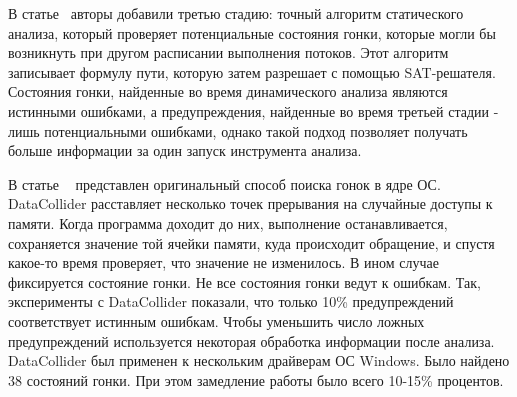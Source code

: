 В статье~\cite{Yoga:2016:PDR} авторы добавили третью стадию: точный алгоритм статического анализа, который проверяет потенциальные состояния гонки, которые могли бы возникнуть при другом расписании выполнения потоков.
Этот алгоритм записывает формулу пути, которую затем разрешает с помощью SAT-решателя.
Состояния гонки, найденные во время динамического анализа являются истинными ошибками, а предупреждения, найденные во время третьей стадии - лишь потенциальными ошибками, однако такой подход позволяет получать больше информации за один запуск инструмента анализа.

В статье ~\cite{DataCollider} представлен оригинальный способ поиска гонок в ядре ОС.
DataCollider расставляет несколько точек прерывания на случайные доступы к памяти.
Когда программа доходит до них, выполнение останавливается, сохраняется значение той ячейки памяти, куда происходит обращение, и спустя какое-то время проверяет, что значение не изменилось.
В ином случае фиксируется состояние гонки.
Не все состояния гонки ведут к ошибкам. Так, эксперименты с DataCollider показали, что только 10\% предупреждений соответствует истинным ошибкам. Чтобы уменьшить число ложных предупреждений используется некоторая обработка информации после анализа.
DataCollider был применен к нескольким драйверам ОС Windows. Было найдено 38 состояний гонки. При этом замедление работы было всего 10-15\% процентов. 

